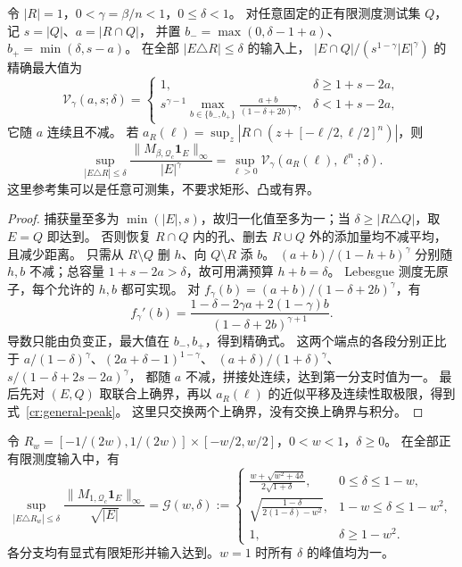 \begin{proposition}[任意维数与分数阶的两端点归约]\label{cr:general}
令 $|R|=1$，$0<\gamma=\beta/n<1$，$0\le\delta<1$。
对任意固定的正有限测度测试集 $Q$，记 $s=|Q|$、$a=|R\cap Q|$，
并置 $b_-=\max(0,\delta-1+a)$、$b_+=\min(\delta,s-a)$。
在全部 $|E\triangle R|\le\delta$ 的输入上，
$|E\cap Q|/(s^{1-\gamma}|E|^\gamma)$ 的精确最大值为
\begin{equation}\label{cr:general-value}
 \mathcal V_\gamma(a,s;\delta)=
 \begin{cases}
 1,&\delta\ge1+s-2a,\\
 \displaystyle s^{\gamma-1}\max_{b\in\{b_-,b_+\}}
 \frac{a+b}{(1-\delta+2b)^\gamma},&\delta<1+s-2a,
 \end{cases}
\end{equation}
它随 $a$ 连续且不减。
若 $a_R(\ell)=\sup_z|R\cap(z+[-\ell/2,\ell/2]^n)|$，则
\begin{equation}\label{cr:general-peak}
 \sup_{|E\triangle R|\le\delta}
 \frac{\|M_{\beta,\mathcal Q_c}\mathbf1_E\|_\infty}{|E|^\gamma}
 =\sup_{\ell>0}\mathcal V_\gamma(a_R(\ell),\ell^n;\delta).
\end{equation}
这里参考集可以是任意可测集，不要求矩形、凸或有界。
\end{proposition}

\begin{proof}
捕获量至多为 $\min(|E|,s)$，故归一化值至多为一；当 $\delta\ge|R\triangle Q|$，取 $E=Q$ 即达到。
否则恢复 $R\cap Q$ 内的孔、删去 $R\cup Q$ 外的添加量均不减平均，且减少距离。
只需从 $R\setminus Q$ 删 $h$、向 $Q\setminus R$ 添 $b$。
$(a+b)/(1-h+b)^\gamma$ 分别随 $h,b$ 不减；总容量 $1+s-2a>\delta$，故可用满预算 $h+b=\delta$。
Lebesgue 测度无原子，每个允许的 $h,b$ 都可实现。
对 $f_\gamma(b)=(a+b)/(1-\delta+2b)^\gamma$，有
\[
 f_\gamma'(b)=\frac{1-\delta-2\gamma a+2(1-\gamma)b}
 {(1-\delta+2b)^{\gamma+1}}.
\]
导数只能由负变正，最大值在 $b_-,b_+$，得到精确式。
这两个端点的各段分别正比于
$a/(1-\delta)^\gamma$、$(2a+\delta-1)^{1-\gamma}$、
$(a+\delta)/(1+\delta)^\gamma$、$s/(1-\delta+2s-2a)^\gamma$，
都随 $a$ 不减，拼接处连续，达到第一分支时值为一。
最后先对 $(E,Q)$ 取联合上确界，再以 $a_R(\ell)$ 的近似平移及连续性取极限，得到式~\eqref{cr:general-peak}。
这里只交换两个上确界，没有交换上确界与积分。
\end{proof}

\begin{theorem}[矩形测度邻域的精确峰值]\label{cr:peak}
令 $R_w=[-1/(2w),1/(2w)]\times[-w/2,w/2]$，$0<w<1$，$\delta\ge0$。
在全部正有限测度输入中，有
\begin{equation}\label{cr:peak-formula}
 \sup_{|E\triangle R_w|\le\delta}
 \frac{\|M_{1,\mathcal Q_c}\mathbf1_E\|_\infty}{\sqrt{|E|}}
 =\mathcal G(w,\delta):=
 \begin{cases}
 \displaystyle\frac{w+\sqrt{w^2+4\delta}}{2\sqrt{1+\delta}},&0\le\delta\le1-w,\\[1ex]
 \displaystyle\sqrt{\frac{1-\delta}{2(1-\delta)-w^2}},&1-w\le\delta\le1-w^2,\\[1ex]
 1,&\delta\ge1-w^2.
 \end{cases}
\end{equation}
各分支均有显式有限矩形并输入达到。$w=1$ 时所有 $\delta$ 的峰值均为一。
\end{theorem}

